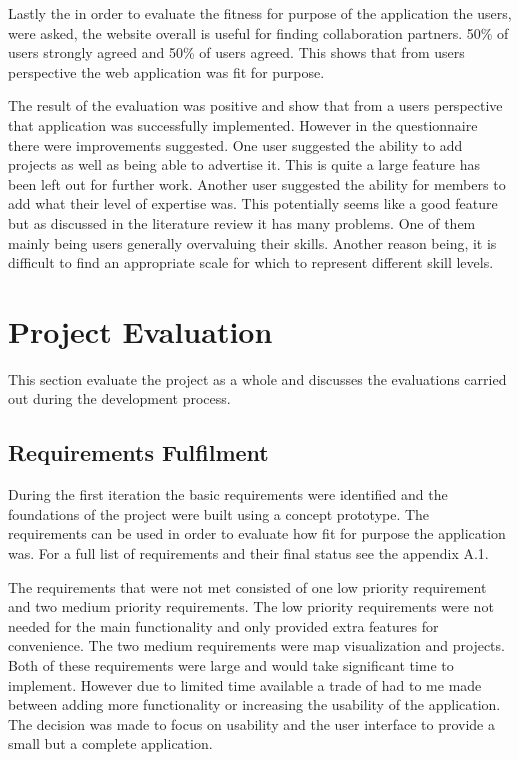 \documentclass[a4paper,oneside,11pt]{report}
\begin{document}
Lastly the in order to evaluate the fitness for purpose of the application the users, were asked, the website overall is useful for finding collaboration partners. 50\% of users strongly agreed and 50\% of users agreed. This shows that from users perspective the web application was fit for purpose.

The result of the evaluation was positive and show that from a users perspective that application was successfully implemented. However in the questionnaire there were improvements suggested. One user suggested the ability to add projects as well as being able to advertise it. This is quite a large feature has been left out for further work. Another user suggested the ability for members to add what their level of expertise was. This potentially seems like a good feature but as discussed in the literature review it has many problems. One of them mainly being users generally overvaluing their skills. Another reason being, it is difficult to find an appropriate scale for which to represent different skill levels.

\chapter{Project Evaluation}
This section evaluate the project as a whole and discusses the evaluations carried out during the development process.
\section{Requirements Fulfilment}
During the first iteration the basic requirements were identified and the foundations of the project were built using a concept prototype. The requirements can be used in order to evaluate how fit for purpose the application was. For a full list of requirements and their final status see the appendix A.1. 

The requirements that were not met consisted of one low priority requirement and two medium priority requirements. The low priority requirements were not needed for the main functionality and only provided extra features for convenience. The two medium requirements were map visualization and projects. Both of these requirements were large and would take significant time to implement. However due to limited time available a trade of had to me made between adding more functionality or increasing the usability of the application. The decision was made to focus on usability and the user interface to provide a small but a complete application.
\end{document}
